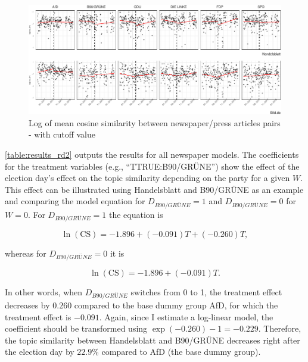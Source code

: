 \documentclass[
]{article}
\begin{document}
\begin{figure}

{\centering \includegraphics[width=1\linewidth]{main_text_files/figure-latex/Daily mean cosine similarity - rd example-1} 

}

\caption{Log of mean cosine similarity between newspaper/press articles pairs - with cutoff value \label{fig:mean_cosine_sim_rd_example}}\label{fig:Daily mean cosine similarity - rd example}
\end{figure}

\autoref{table:results_rd2} outputs the results for all newspaper
models. The coefficients for the treatment variables (e.g.,
``TTRUE:B90/GRÜNE'') show the effect of the election day's effect on the
topic similarity depending on the party for a given \(W\). This effect
can be illustrated using Handelsblatt and B90/GRÜNE as an example and
comparing the model equation for \(D_{B90/GRÜNE} = 1\) and
\(D_{B90/GRÜNE} = 0\) for \(W=0\). For \(D_{B90/GRÜNE} = 1\) the
equation is

\[
\ln(\text{CS})=-1.896+(-0.091)T+(-0.260)T,
\]

whereas for \(D_{B90/GRÜNE} = 0\) it is

\[
\ln(\text{CS})=-1.896+(-0.091)T.
\]

In other words, when \(D_{B90/GRÜNE}\) switches from 0 to 1, the
treatment effect decreases by \(0.260\) compared to the base dummy group
AfD, for which the treatment effect is \(-0.091\). Again, since I
estimate a log-linear model, the coefficient should be transformed using
\(\exp(-0.260)-1 = -0.229\). Therefore, the topic similarity between
Handelsblatt and B90/GRÜNE decreases right after the election day by
\(22.9\%\) compared to AfD (the base dummy group).
\end{document}
